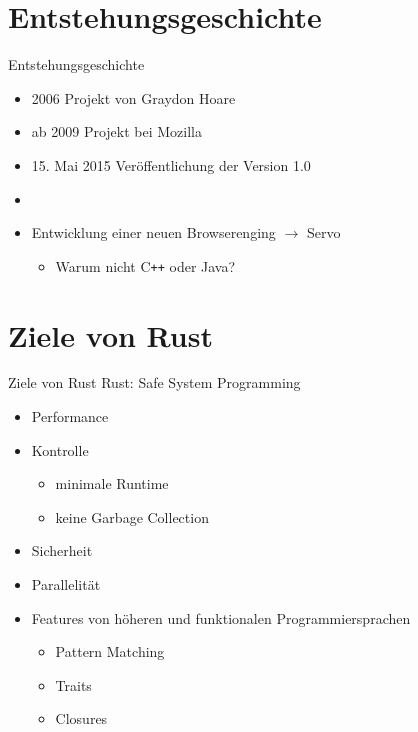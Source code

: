 \documentclass{beamer}
\begin{document}
\section{Entstehungsgeschichte}

\begin{frame}{Entstehungsgeschichte}
	\begin{itemize}
	  \item 2006 Projekt von Graydon Hoare
	  \item ab 2009 Projekt bei Mozilla
	  \item 15. Mai 2015 Veröffentlichung der Version 1.0
	  \pause
	  \item[]
	  \item Entwicklung einer neuen Browserenging $\rightarrow$ Servo
	  \pause
	  \begin{itemize}
		\item Warum nicht C\texttt{++} oder Java?
	  \end{itemize}
	 \end{itemize}	 
\end{frame}

\section{Ziele von Rust}
\begin{frame}{Ziele von Rust}
Rust: Safe System Programming
	  \begin{itemize}
	  	  \pause
	      \item Performance
	      \pause
	      \item Kontrolle 
	      \begin{itemize}
	          \item minimale Runtime
	          \item keine Garbage Collection
	      \end{itemize}
	      \pause
	      \item Sicherheit      
	      \pause
	      \item Parallelität
	      \pause
	      \item Features von höheren und funktionalen Programmiersprachen
	      \begin{itemize}
	        \item Pattern Matching
	        \item Traits
	        \item Closures
	      \end{itemize}
	  \end{itemize}
\end{frame}
\end{document}
